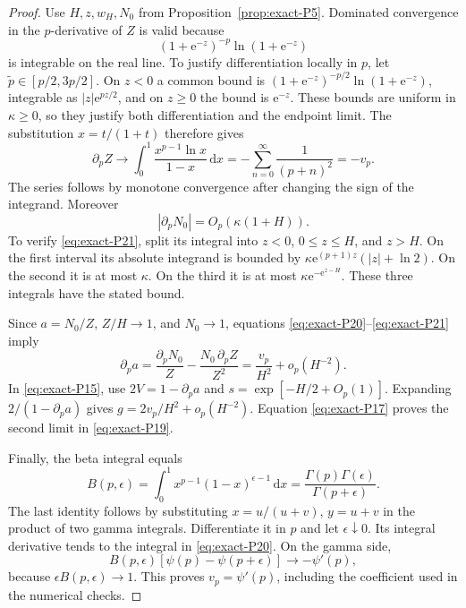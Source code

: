 \begin{proof}
Use \(H,z,w_H,N_0\) from Proposition~\ref{prop:exact-P5}. Dominated convergence in the \(p\)-derivative of \(Z\) is valid because
\begin{equation}
 (1+\mathrm{e}^{-z})^{-p}\ln(1+\mathrm{e}^{-z})
\end{equation}
is integrable on the real line. To justify differentiation locally in $p$, let $\widetilde p\in[p/2,3p/2]$. On $z<0$ a common bound is $(1+\mathrm{e}^{-z})^{-p/2}\ln(1+\mathrm{e}^{-z})$, integrable as $|z|\mathrm{e}^{pz/2}$, and on $z\geq0$ the bound is $\mathrm{e}^{-z}$. These bounds are uniform in $\kappa\geq0$, so they justify both differentiation and the endpoint limit. The substitution \(x=t/(1+t)\) therefore gives
\begin{equation}
 \partial_pZ\longrightarrow
 \int_0^1\frac{x^{p-1}\ln x}{1-x}\,\mathrm{d}x
 =-\sum_{n=0}^\infty\frac1{(p+n)^2}=-v_p.             \label{eq:exact-P20}
\end{equation}
The series follows by monotone convergence after changing the sign of the integrand. Moreover
\begin{equation}
 |\partial_pN_0|=O_p(\kappa(1+H)).                    \label{eq:exact-P21}
\end{equation}
To verify \eqref{eq:exact-P21}, split its integral into \(z<0\), \(0\le z\le H\), and \(z>H\). On the first interval its absolute integrand is bounded by
\(\kappa \mathrm{e}^{(p+1)z}(|z|+\ln2)\). On the second it is at most \(\kappa\). On the third it is at most
\(\kappa \mathrm{e}^{-\mathrm{e}^{z-H}}\). These three integrals have the stated bound.

Since \(a=N_0/Z\), \(Z/H\to1\), and \(N_0\to1\), equations \eqref{eq:exact-P20}--\eqref{eq:exact-P21} imply
\begin{equation}
 \partial_p a
 =\frac{\partial_pN_0}{Z}-\frac{N_0\,\partial_pZ}{Z^2}
 =\frac{v_p}{H^2}+o_p(H^{-2}).
\end{equation}
In \eqref{eq:exact-P15}, use \(2V=1-\partial_pa\) and
\(s=\exp[-H/2+O_p(1)]\). Expanding \(2/(1-\partial_pa)\) gives
\(g=2v_p/H^2+o_p(H^{-2})\). Equation \eqref{eq:exact-P17} proves the second limit in \eqref{eq:exact-P19}.

Finally, the beta integral equals
\begin{equation}
 B(p,\epsilon)=\int_0^1x^{p-1}(1-x)^{\epsilon-1}\,\mathrm{d}x
 =\frac{\Gamma(p)\Gamma(\epsilon)}{\Gamma(p+\epsilon)}.
\end{equation}
The last identity follows by substituting \(x=u/(u+v)\), \(y=u+v\) in the product of two gamma integrals. Differentiate it in \(p\) and let \(\epsilon\downarrow0\). Its integral derivative tends to the integral in \eqref{eq:exact-P20}. On the gamma side,
\begin{equation}
 B(p,\epsilon)[\psi(p)-\psi(p+\epsilon)]\to-\psi'(p),
\end{equation}
because \(\epsilon B(p,\epsilon)\to1\). This proves \(v_p=\psi'(p)\), including the coefficient used in the numerical checks. \end{proof}

